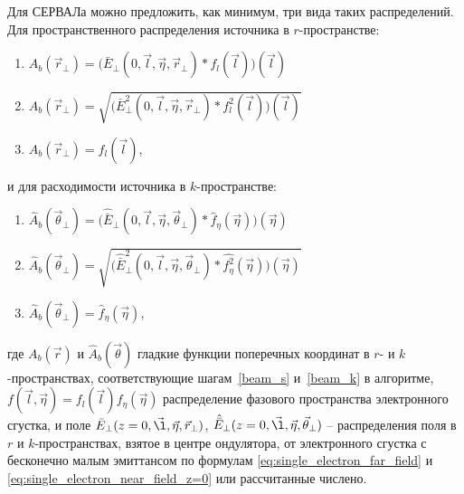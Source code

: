 Для СЕРВАЛа можно предложить, как минимум, три вида таких распределений. Для пространственного распределения источника в $r$-пространстве:
\begin{enumerate}[label=\Roman*.]
	\item \label{amplitude} ${A}_{b} (\vec{r}_{\bot}) = \big(\bar{E}_{\bot}(0, \vec{l}, \vec{\eta}, \vec{r}_{\bot}) \ast f_l(\vec{l})\big)(\vec{l})$ \\

	\item \label{intensity} ${A}_{b} (\vec{r}_{\bot}) = \sqrt{\big(\bar{E}^2_{\bot}(0,  \vec{l}, \vec{\eta}, \vec{r}_{\bot}) \ast f_l^2(\vec{l})\big)(\vec{l})}$ \\

	\item \label{e-beam} ${A}_{b} (\vec{r}_{\bot}) = f_l(\vec{l})$,
\end{enumerate}
и для расходимости источника в $k$-пространстве:
\begin{enumerate}[label=\Roman*.]
	\item \label{amplitude} $\hat{{A}}_{b} (\vec{\theta}_{\bot}) = \big(\hat{\bar{E}}_{\bot}(0,  \vec{l}, \vec{\eta}, \vec{\theta}_{\bot}) \ast \hat{f}_{\eta}(\vec{\eta})\big)(\vec{\eta})$\\
	
	\item \label{intensity} $\hat{{A}}_{b} (\vec{\theta}_{\bot}) = \sqrt{\big(\hat{\bar{E}}^2_{\bot}(0,  \vec{l}, \vec{\eta}, \vec{\theta}_{\bot}) \ast \hat{f_{\eta}^2}(\vec{\eta})\big)(\vec{\eta})}$\\
	
	\item \label{e-beam} $\hat{{A}}_{b} (\vec{\theta}_{\bot}) = \hat{f}_{\eta}(\vec{\eta})$,
\end{enumerate}
где ${A}_{b} (\vec{r})$ и $\hat{{A}}_{b} (\vec{\theta})$ гладкие функции поперечных координат в $r$- и $k$-пространствах, соответствующие шагам~\ref{beam_s} и~\ref{beam_k} в алгоритме,  $f(\vec{l}, \vec{\eta}) = f_l(\vec{l}) f_{\eta}(\vec{\eta})$ распределение фазового пространства электронного сгустка, и поле $\bar{E}_{\bot}(z=0, \vec{\l}, \vec{\eta}, \vec{r}_{\bot})$, $\hat{\bar{E}}_{\bot}(z=0 , \vec{\l}, \vec{\eta}, \vec{\theta}_{\bot})$ -- распределения поля в $r$ и $k$-пространствах, взятое в центре ондулятора, от электронного сгустка с бесконечно малым эмиттансом по формулам \ref{eq:single_electron_far_field} и \ref{eq:single_electron_near_field_z=0} или рассчитанные числено.

